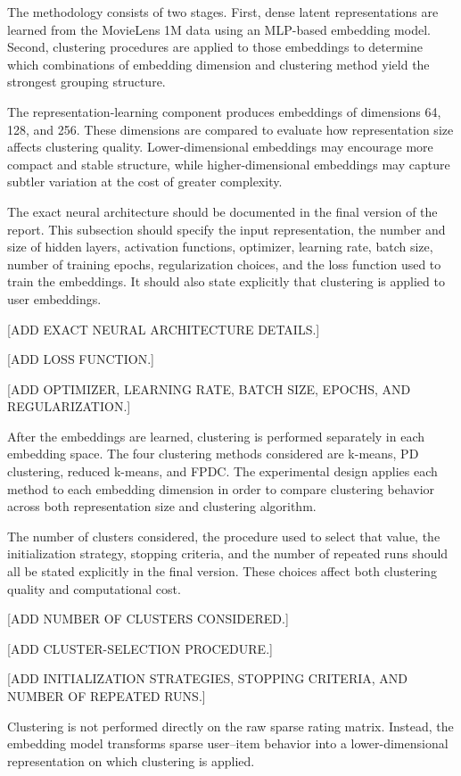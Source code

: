 \documentclass[
  11pt,
]{article}
\begin{document}
The methodology consists of two stages. First, dense latent
representations are learned from the MovieLens 1M data using an
MLP-based embedding model. Second, clustering procedures are applied to
those embeddings to determine which combinations of embedding dimension
and clustering method yield the strongest grouping structure.

The representation-learning component produces embeddings of dimensions
64, 128, and 256. These dimensions are compared to evaluate how
representation size affects clustering quality. Lower-dimensional
embeddings may encourage more compact and stable structure, while
higher-dimensional embeddings may capture subtler variation at the cost
of greater complexity.

The exact neural architecture should be documented in the final version
of the report. This subsection should specify the input representation,
the number and size of hidden layers, activation functions, optimizer,
learning rate, batch size, number of training epochs, regularization
choices, and the loss function used to train the embeddings. It should
also state explicitly that clustering is applied to user embeddings.

{[}ADD EXACT NEURAL ARCHITECTURE DETAILS.{]}

{[}ADD LOSS FUNCTION.{]}

{[}ADD OPTIMIZER, LEARNING RATE, BATCH SIZE, EPOCHS, AND
REGULARIZATION.{]}

After the embeddings are learned, clustering is performed separately in
each embedding space. The four clustering methods considered are
k-means, PD clustering, reduced k-means, and FPDC. The experimental
design applies each method to each embedding dimension in order to
compare clustering behavior across both representation size and
clustering algorithm.

The number of clusters considered, the procedure used to select that
value, the initialization strategy, stopping criteria, and the number of
repeated runs should all be stated explicitly in the final version.
These choices affect both clustering quality and computational cost.

{[}ADD NUMBER OF CLUSTERS CONSIDERED.{]}

{[}ADD CLUSTER-SELECTION PROCEDURE.{]}

{[}ADD INITIALIZATION STRATEGIES, STOPPING CRITERIA, AND NUMBER OF
REPEATED RUNS.{]}

Clustering is not performed directly on the raw sparse rating matrix.
Instead, the embedding model transforms sparse user--item behavior into
a lower-dimensional representation on which clustering is applied.
\end{document}
